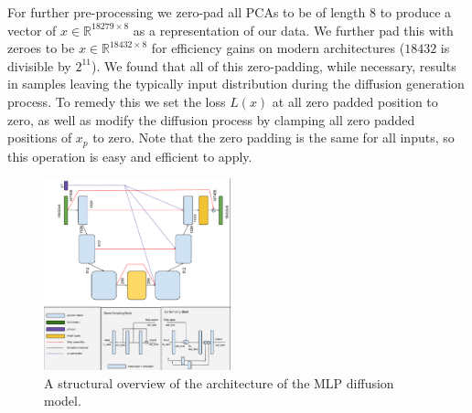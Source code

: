 For further pre-processing we zero-pad all PCAs to be of length $8$ to produce a vector of $x \in \mathbb{R}^{18279\times8}$ as a representation of our data. We further pad this with zeroes to be $x \in \mathbb{R}^{18432\times8}$ for efficiency gains on modern architectures ($18432$ is divisible by $2^{11}$). We found that all of this zero-padding, while necessary, results in samples leaving the typically input distribution during the diffusion generation process. To remedy this we set the loss $L(x)$ at all zero padded position to zero, as well as modify the diffusion process by clamping all zero padded positions of $x_p$ to zero. Note that the zero padding is the same for all inputs, so this operation is easy and efficient to apply.



\begin{figure}
    \centering
    \includegraphics[width = 0.48\textwidth]{figures/UnetMLP.pdf}
    \caption{A structural overview of the architecture of the MLP diffusion model.}
    \label{fig:unet}
\end{figure}

